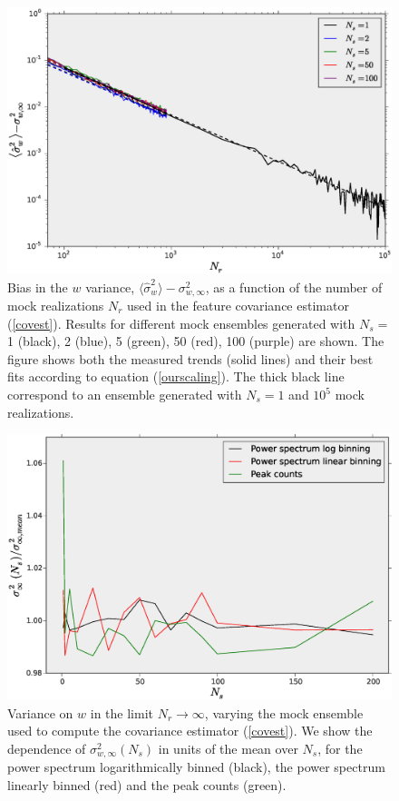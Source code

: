 \documentclass[reprint,aps,prd,superscriptaddress,showkeys,showpacs]{revtex4-1}
\newcommand{\h}[1]{\hat{#1}}
\begin{document}
\begin{figure}
\includegraphics[scale=0.3]{Figures/scaling_nr.eps}
\caption{Bias in the $w$ variance, $\langle\h{\sigma}^2_w\rangle-\sigma^2_{w,\infty}$, as a function of the number of mock realizations $N_r$ used in the feature covariance estimator (\ref{covest}). Results for different mock ensembles generated with $N_s=$1 (black), 2 (blue), 5 (green), 50 (red), 100 (purple) are shown. The figure shows both the measured trends (solid lines) and their best fits according to equation (\ref{ourscaling}). The thick black line correspond to an ensemble generated with $N_s=1$ and $10^5$ mock realizations. }
\label{wvar_nr}
\end{figure}

\begin{figure}
\includegraphics[scale=0.3]{Figures/scaling_ns.eps}
\caption{Variance on $w$ in the limit $N_r\rightarrow\infty$, varying the mock ensemble used to compute the covariance estimator (\ref{covest}). We show the dependence of $\sigma_{w,\infty}^2(N_s)$ in units of the mean over $N_s$, for the power spectrum logarithmically binned (black), the power spectrum linearly binned (red) and the peak counts (green).}
\label{wvar_ns}
\end{figure}
\end{document}
